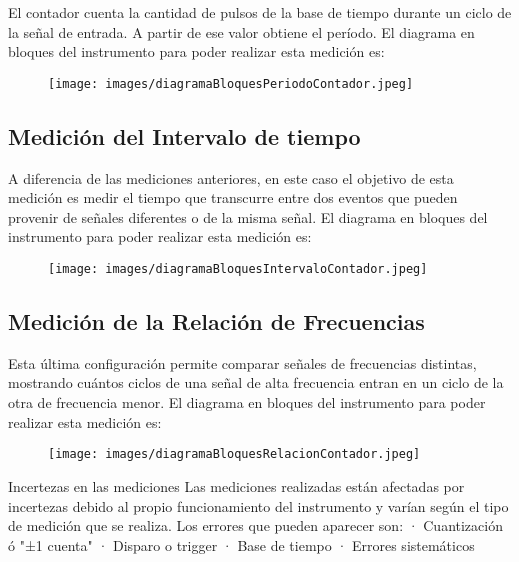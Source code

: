 \documentclass{article}
\begin{document}
	El contador cuenta la cantidad de pulsos de la base de tiempo durante un ciclo de la señal de entrada. A partir de ese valor obtiene el período.
	\medskip
	El diagrama en bloques del instrumento para poder realizar esta medición es:
		
		
	\begin{figure}[h]
		\centering
		\texttt{[image: images/diagramaBloquesPeriodoContador.jpeg]}
		\medskip
	\end{figure}
	\bigskip\bigskip
	
	
\subsection{Medición del Intervalo de tiempo}
	
	A diferencia de las mediciones anteriores, en este caso el objetivo de esta medición es medir el tiempo que transcurre entre dos eventos que pueden provenir de señales diferentes o de la misma señal.
	\medskip
	El diagrama en bloques del instrumento para poder realizar esta medición es:
	
	\begin{figure}[h]
		\centering
		\texttt{[image: images/diagramaBloquesIntervaloContador.jpeg]}
		\medskip
	\end{figure}
	\bigskip\bigskip
	
\subsection{Medición de la Relación de Frecuencias} 
	\medskip
	Esta última configuración permite comparar señales de frecuencias distintas, mostrando cuántos ciclos de una señal de alta frecuencia entran en un ciclo de la otra de frecuencia menor.
	\medskip
	El diagrama en bloques del instrumento para poder realizar esta medición es:
	
	\begin{figure}[h]
		\centering
		\texttt{[image: images/diagramaBloquesRelacionContador.jpeg]}
		\medskip
	\end{figure}
	\bigskip\bigskip
	
	Incertezas en las mediciones
	\medskip
		Las mediciones realizadas están afectadas por incertezas debido al propio funcionamiento del instrumento y varían según el tipo de medición que se realiza.
		\medskip
		Los errores que pueden aparecer son:
			· Cuantización ó "±1 cuenta"
			· Disparo o trigger
			· Base de tiempo
			· Errores sistemáticos
	
\end{document}
